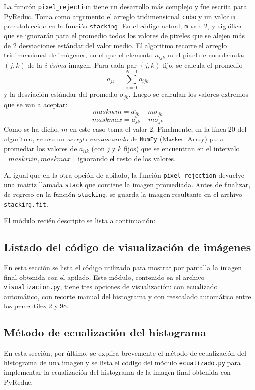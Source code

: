 \documentclass[a4paper, 12pt]{article}
\begin{document}
La función {\tt pixel\_rejection} tiene un desarrollo más complejo y fue escrita para PyReduc. Toma como argumento el arreglo tridimensional \texttt{cubo} y un valor {\tt m} preestablecido en la función {\tt stacking}. En el código actual, {\tt m} vale 2, y significa que se ignorarán para el promedio todos los valores de pixeles que se alejen más de 2 desviaciones estándar del valor medio. El algoritmo recorre el arreglo tridimensional de imágenes, en el que el elemento $a_{ijk}$ es el pixel de coordenadas $(j,k)$ de la {\it i-ésima} imagen.
Para cada par $(j,k)$ fijo, se calcula el promedio $$\overline{a_{jk}}=\sum_{i=0}^{N-1}a_{ijk}$$
y la desviación estándar del promedio $\sigma_{jk}$. Luego se calculan los valores extremos que se van a aceptar:
$$maskmin = \overline{a_{jk}} - m\sigma_{jk}$$
$$maskmax = \overline{a_{jk}} - m\sigma_{jk}$$
Como se ha dicho, $m$ en este caso toma el valor 2. Finalmente, en la línea 20 del algoritmo, se usa un {\it arreglo enmascarado} de {\tt NumPy} (Masked Array) para promediar los valores de $a_{ijk}$ (con $j$ y $k$ fijos) que se encuentran en el intervalo $[maskmin, maskmax]$ ignorando el resto de los valores.

Al igual que en la otra opción de apilado, la función \texttt{pixel\_rejection} devuelve una matriz llamada \texttt{stack} que contiene la imagen promediada. Antes de finalizar, de regreso en la función \texttt{stacking}, se guarda la imagen resultante en el archivo \texttt{stacking.fit}.

El módulo recién descripto se lista a continuación:


\subsection{Listado del código de visualización de imágenes}
En esta sección se lista el código utilizado para mostrar por pantalla la imagen final obtenida con el apilado. Este módulo, contenido en el archivo \texttt{visualizacion.py}, tiene tres opciones de visualización: con ecualizado automático, con recorte manual del histograma y con reescalado automático entre los percentiles 2 y 98.


\subsection{Método de ecualización del histograma}
\label{sec:ecualizado}
En esta sección, por último, se explica brevemente el método de ecualización del histograma de una imagen y se lista el código del módulo \texttt{ecualizado.py} para implementar la ecualización del histograma de la imagen final obtenida con PyReduc.
\end{document}
